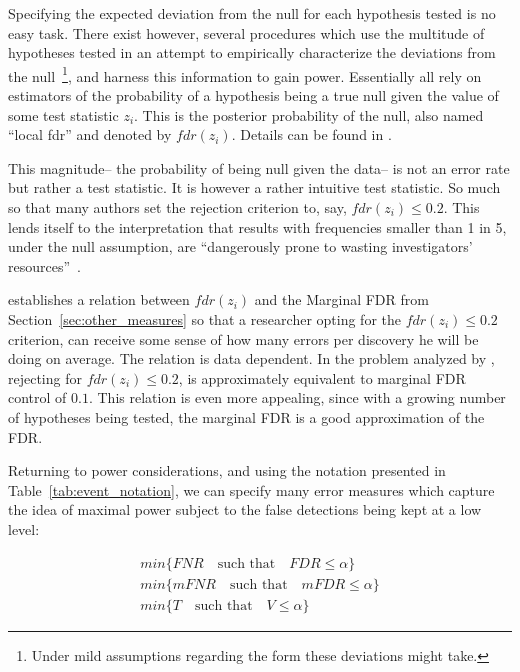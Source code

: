\documentclass[review,12pt]{article}
\begin{document}
Specifying the expected deviation from the null for each hypothesis tested is no easy task. There exist however, several procedures which use the multitude of hypotheses tested in an attempt to empirically characterize the deviations from the null~\footnote{ Under mild assumptions regarding the form these deviations might take.}, and harness this information to gain power. Essentially all rely on estimators of the probability of a hypothesis being a true null given the value of some test statistic $z_i$. This is the posterior probability of the null, also named ``local fdr'' and denoted by $fdr(z_i)$. Details can be found in \cite{efron_microarrays_2008}. 

This magnitude-- the probability of being null given the data-- is not an error rate but rather a test statistic. It is however a rather intuitive test statistic. So much so that many authors set the rejection criterion to, say, $fdr(z_i)\leq 0.2$. This lends itself to the interpretation that results with frequencies smaller than 1 in 5, under the null assumption, are ``dangerously prone to wasting investigators' resources''~\cite{efron_microarrays_2008}. 

\citet{storey_positive_2003} establishes a relation between $fdr(z_i)$ and the Marginal FDR from Section~\ref{sec:other_measures} so that a researcher opting for the $fdr(z_i)\leq 0.2$ criterion, can receive some sense of how many errors per discovery he will be doing on average.  The relation is data dependent. In the problem analyzed by \citet{efron_microarrays_2008}, rejecting for $fdr(z_i)\leq 0.2$, is approximately equivalent to marginal FDR control of $0.1$.
This relation is even more appealing, since with a growing number of hypotheses being tested, the marginal FDR is a good approximation of the FDR. 

Returning to power considerations, and using the notation presented in Table~\ref{tab:event_notation}, we can specify many error measures which capture the idea of maximal power subject to the false detections being kept at a low level:

\begin{align}
        min\{FNR \quad \text{such that} \quad FDR\leq \alpha \} \label{eq:compound_1}\\
	min\{mFNR \quad \text{such that} \quad mFDR\leq \alpha \} \label{eq:compound_2}\\
	min\{T \quad \text{such that} \quad V \leq \alpha \} \label{eq:compound_3}
\end{align}
\end{document}
